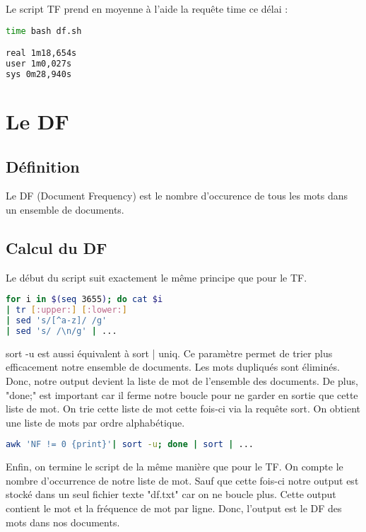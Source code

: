 \documentclass{article}
\begin{document}
Le script TF prend en moyenne à l'aide la requête time ce délai :

\begin{lstlisting}[language=bash,caption={Suppression}]
time bash df.sh

real 1m18,654s
user 1m0,027s
sys 0m28,940s

\end{lstlisting}

\section{Le DF}

\subsection{Définition}

Le DF (Document Frequency) est le nombre d'occurence de tous les mots dans un ensemble de documents.

\subsection{Calcul du DF}

Le début du script suit exactement le même principe que pour le TF.

\begin{lstlisting}[language=bash,caption={Bouclage}]
for i in $(seq 3655); do cat $i 
| tr [:upper:] [:lower:]
| sed 's/[^a-z]/ /g' 
| sed 's/ /\n/g' | ...
\end{lstlisting}

sort -u est aussi équivalent à sort | uniq.
Ce paramètre permet de trier plus efficacement notre ensemble de documents. Les mots dupliqués sont éliminés. Donc, notre output devient la liste de mot de l'ensemble des documents. De plus, "done;" est important car il ferme notre boucle pour ne garder en sortie que cette liste de mot.
On trie cette liste de mot cette fois-ci via la requête sort. On obtient une liste de mots par ordre alphabétique.

\begin{lstlisting}[language=bash,caption={Tris}]
awk 'NF != 0 {print}'| sort -u; done | sort | ...
\end{lstlisting}

Enfin, on termine le script de la même manière que pour le TF. On compte le nombre d'occurrence de notre liste de mot. Sauf que cette fois-ci notre output est stocké dans un seul fichier texte "df.txt" car on ne boucle plus. Cette output contient le mot et la fréquence de mot par ligne. Donc, l'output est le DF des mots dans nos documents.
\end{document}
